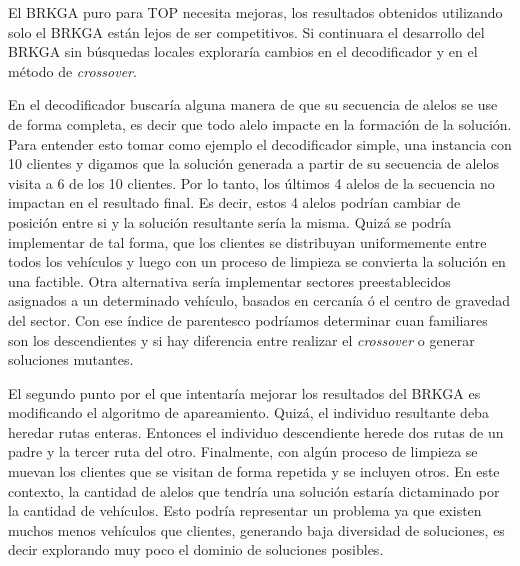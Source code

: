 \bigskip

El BRKGA puro para TOP necesita mejoras, los resultados obtenidos utilizando solo el BRKGA están lejos de ser competitivos. Si continuara el desarrollo del BRKGA sin búsquedas locales exploraría cambios en el decodificador y en el método de \textit{crossover}. 

\bigskip

En el decodificador buscaría alguna manera de que su secuencia de alelos se use de forma completa, es decir que todo alelo impacte en la formación de la solución. Para entender esto tomar como ejemplo el decodificador simple, una instancia con 10 clientes y digamos que la solución generada a partir de su secuencia de alelos visita a 6 de los 10 clientes. Por lo tanto, los últimos 4 alelos de la secuencia no impactan en el resultado final. Es decir, estos 4 alelos podrían cambiar de posición entre si y la solución resultante sería la misma. Quizá se podría implementar de tal forma, que los clientes se distribuyan uniformemente entre todos los vehículos y luego con un proceso de limpieza se convierta la solución en una factible. Otra alternativa sería implementar sectores preestablecidos asignados a un determinado vehículo, basados en cercanía ó el centro de gravedad del sector. Con ese índice de parentesco podríamos determinar cuan familiares son los descendientes y si hay diferencia entre realizar el \textit{crossover} o generar soluciones mutantes.

\bigskip

El segundo punto por el que intentaría mejorar los resultados del BRKGA es modificando el algoritmo de apareamiento. Quizá, el individuo resultante deba heredar rutas enteras. Entonces el individuo descendiente herede dos rutas de un padre y la tercer ruta del otro. Finalmente, con algún proceso de limpieza se muevan los clientes que se visitan de forma repetida y se incluyen otros. En este contexto, la cantidad de alelos que tendría una solución estaría dictaminado por la cantidad de vehículos. Esto podría representar un problema ya que existen muchos menos vehículos que clientes, generando baja diversidad de soluciones, es decir explorando muy poco el dominio de soluciones posibles.

\bigskip

